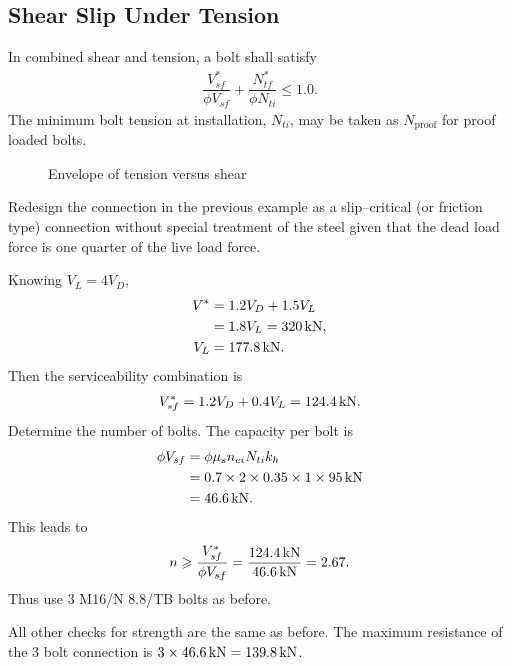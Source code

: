 \subsection{Shear Slip Under Tension}\label{sec:bolt_combined_s}
In combined shear and tension, a bolt shall satisfy
\begin{gather}
\dfrac{V^*_{sf}}{\phi{}V_{sf}}+\dfrac{N^*_{tf}}{\phi{}N_{ti}}\leqslant1.0.
\end{gather}
The minimum bolt tension at installation, $N_{ti}$, may be taken as $N_\text{proof}$ for proof loaded bolts.
\begin{figure}[H]
\centering\caption{Envelope of tension versus shear}
\end{figure}

\begin{exmp}
Redesign the connection in the previous example as a slip--critical (or friction type) connection without special treatment of the steel given that the dead load force is one quarter of the live load force.
\end{exmp}
\begin{solution}
Knowing $V_L=4V_D$,
\begin{align*}
V^*&=1.2V_D+1.5V_L\\&=1.8V_L=\SI{320}{\kilo\newton},\\
V_L&=\SI{177.8}{\kilo\newton}.
\end{align*}
Then the serviceability combination is
\begin{gather*}
V^*_{sf}=1.2V_D+0.4V_L=\SI{124.4}{\kilo\newton}.
\end{gather*}
Determine the number of bolts.
The capacity per bolt is
\begin{align*}
\phi{}V_{sf}&=\phi{}\mu_sn_{ei}N_{ti}k_h\\
&=0.7\times2\times0.35\times1\times\SI{95}{\kilo\newton}\\
&=\SI{46.6}{\kilo\newton}.
\end{align*}
This leads to
\begin{gather*}
n\geqslant\dfrac{V^*_{sf}}{\phi{}V_{sf}}=\dfrac{\SI{124.4}{\kilo\newton}}{\SI{46.6}{\kilo\newton}}=2.67.
\end{gather*}
Thus use 3 M16/N 8.8/TB bolts as before.

All other checks for strength are the same as before.
The maximum resistance of the 3 bolt connection is $3\times\SI{46.6}{\kilo\newton}=\SI{139.8}{\kilo\newton}$.
\end{solution}